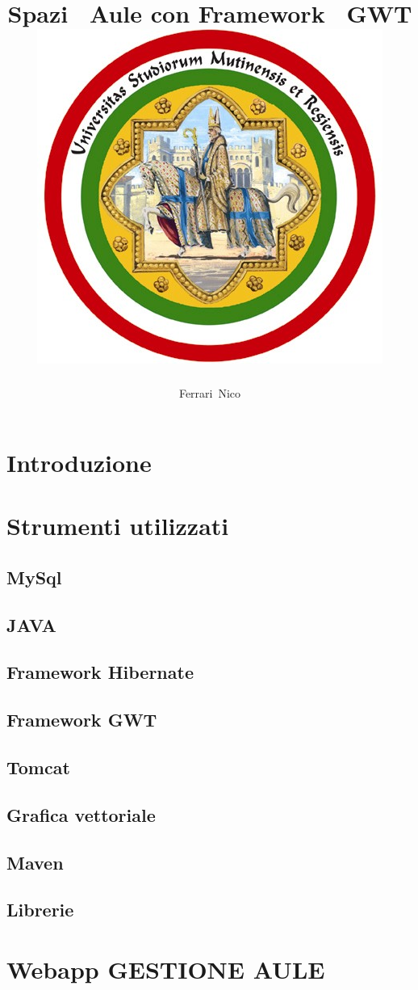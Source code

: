 \documentclass[a4paper,pt11,oneside]{book}
\title{
\huge
\textbf{Spazi ~Aule con Framework ~GWT}\\
{\includegraphics[scale=2]{university.jpg}}}
\author{Ferrari~Nico}
\begin{document}
\maketitle
\renewcommand{\contentsname}{Indice}
\tableofcontents
\listoffigures
\listoftables

\chapter{Introduzione}


\chapter{Strumenti utilizzati}
\section{MySql}

\section{JAVA}

\section{Framework Hibernate}

\section{Framework GWT}

\section{Tomcat}

\section{Grafica vettoriale}

\section{Maven}

\section{Librerie}


\chapter{Webapp GESTIONE AULE}

\end{document}
